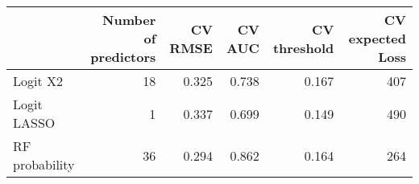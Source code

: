 
\begin{tabular}{lrrrrr}
\toprule
  & Number of predictors & CV RMSE & CV AUC & CV threshold & CV expected Loss\\
\midrule
Logit X2 & 18 & 0.325 & 0.738 & 0.167 & 407\\
Logit LASSO & 1 & 0.337 & 0.699 & 0.149 & 490\\
RF probability & 36 & 0.294 & 0.862 & 0.164 & 264\\
\bottomrule
\end{tabular}